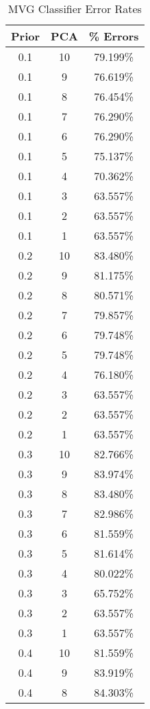 \begin{center}
\begin{longtable}{|c|c|c|}
\caption{MVG Classifier Error Rates}\label{tab:mvg_naiveacctable}\\
\hline
Prior & PCA & \% Errors \\
\hline
0.1 & 10 & 79.199\% \\
\hline
0.1 & 9 & 76.619\% \\
\hline
0.1 & 8 & 76.454\% \\
\hline
0.1 & 7 & 76.290\% \\
\hline
0.1 & 6 & 76.290\% \\
\hline
0.1 & 5 & 75.137\% \\
\hline
0.1 & 4 & 70.362\% \\
\hline
0.1 & 3 & 63.557\% \\
\hline
0.1 & 2 & 63.557\% \\
\hline
0.1 & 1 & 63.557\% \\
\hline
\hline
0.2 & 10 & 83.480\% \\
\hline
0.2 & 9 & 81.175\% \\
\hline
0.2 & 8 & 80.571\% \\
\hline
0.2 & 7 & 79.857\% \\
\hline
0.2 & 6 & 79.748\% \\
\hline
0.2 & 5 & 79.748\% \\
\hline
0.2 & 4 & 76.180\% \\
\hline
0.2 & 3 & 63.557\% \\
\hline
0.2 & 2 & 63.557\% \\
\hline
0.2 & 1 & 63.557\% \\
\hline
\hline
0.3 & 10 & 82.766\% \\
\hline
0.3 & 9 & 83.974\% \\
\hline
0.3 & 8 & 83.480\% \\
\hline
0.3 & 7 & 82.986\% \\
\hline
0.3 & 6 & 81.559\% \\
\hline
0.3 & 5 & 81.614\% \\
\hline
0.3 & 4 & 80.022\% \\
\hline
0.3 & 3 & 65.752\% \\
\hline
0.3 & 2 & 63.557\% \\
\hline
0.3 & 1 & 63.557\% \\
\hline
\hline
0.4 & 10 & 81.559\% \\
\hline
0.4 & 9 & 83.919\% \\
\hline
0.4 & 8 & 84.303\% \\

\end{longtable}
\end{center}
